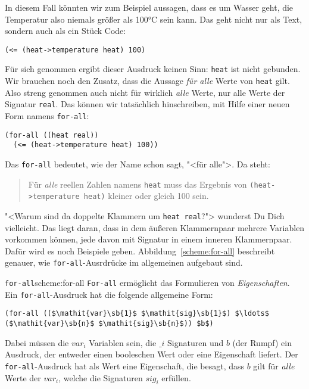 In diesem Fall könnten wir zum Beispiel aussagen, dass es um Wasser
geht, die Temperatur also niemals größer als 100\si{\degree}C sein kann.  Das
geht nicht nur als Text, sondern auch als ein Stück Code:
%
\begin{lstlisting}
(<= (heat->temperature heat) 100)
\end{lstlisting}
%
Für sich genommen ergibt dieser Ausdruck keinen Sinn: \lstinline{heat}
ist nicht gebunden.  Wir brauchen noch den Zusatz, dass die Aussage
\emph{für alle} Werte von \lstinline{heat} gilt.  Also streng genommen
auch nicht für wirklich \emph{alle} Werte, nur alle Werte der Signatur
\lstinline{real}. Das können wir tatsächlich hinschreiben, mit Hilfe
einer neuen Form namens \lstinline{for-all}:
%
\begin{lstlisting}
(for-all ((heat real))
  (<= (heat->temperature heat) 100))
\end{lstlisting}
%
Das \lstinline{for-all} 
bedeutet, wie der Name schon sagt, "<für alle">.  Da steht:
%
\begin{quote}
  Für \emph{alle} reellen Zahlen namens \lstinline{heat} muss das
  Ergebnis von \lstinline{(heat->temperature heat)} kleiner oder
  gleich 100 sein.
\end{quote}
%
"<Warum sind da doppelte Klammern um \lstinline{heat real}?"> wunderst
Du Dich vielleicht.  Das liegt daran, dass in dem äußeren Klammernpaar
mehrere Variablen vorkommen können, jede davon mit Signatur in einem
inneren Klammernpaar.  Dafür wird es noch Beispiele geben.
Abbildung~\ref{scheme:for-all} beschreibt genauer, wie
\lstinline{for-all}-Ausrdrücke im allgemeinen aufgebaut sind.

\begin{feature}{\lstinline{for-all}}{scheme:for-all}
  \lstinline{For-all} ermöglicht das
  Formulieren von \textit{Eigenschaften}.  Ein
  \lstinline{for-all}-Ausdruck hat die folgende allgemeine Form:
%
\begin{lstlisting}
(for-all (($\mathit{var}\sb{1}$ $\mathit{sig}\sb{1}$) $\ldots$ ($\mathit{var}\sb{n}$ $\mathit{sig}\sb{n}$)) $b$)
\end{lstlisting}
%
Dabei müssen die $\mathit{var}_i$ Variablen sein, die $\_i$ Signaturen und $b$ (der
Rumpf) ein Ausdruck, der entweder einen booleschen Wert oder eine
Eigenschaft liefert.  Der \lstinline{for-all}-Ausdruck hat als Wert eine
Eigenschaft, die besagt, dass $b$ gilt für \emph{alle} Werte der
$\mathit{var}_i$, welche die Signaturen $\mathit{sig}_i$ erfüllen.
\end{feature}

